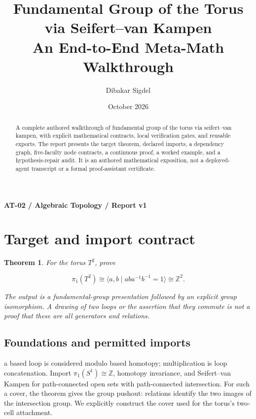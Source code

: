 \documentclass[preprint,12pt,aps,pra,showkeys,amsmath,amssymb,superscriptaddress,floatfix]{revtex4-2}
\newtheorem{theorem}{Theorem}[section]
\theoremstyle{definition}
\theoremstyle{remark}
\begin{document}
\title{Fundamental Group of the Torus via Seifert--van Kampen\\[4pt]\large An End-to-End Meta-Math Walkthrough}

\author{Dibakar Sigdel}


\date{October 2026}

\begin{abstract}

A complete authored walkthrough of fundamental group of the torus via
seifert--van kampen, with explicit mathematical contracts, local
verification gates, and reusable exports. The report presents the target
theorem, declared imports, a dependency graph, five-faculty node
contracts, a continuous proof, a worked example, and a hypothesis-repair
audit. It is an authored mathematical exposition, not a deployed-agent
transcript or a formal proof-assistant certificate.

\end{abstract}\maketitle\linespread{1.12}\selectfont

\noindent\textbf{AT-02 / Algebraic Topology / Report v1}

\section{Target and import contract}

\begin{theorem}

For the torus \(T^2\), prove

\[\pi_1(T^2)\cong\langle a,b\mid aba^{-1}b^{-1}=1\rangle\cong\mathbb Z^2.\]

The output is a fundamental-group presentation followed by an explicit
group isomorphism. A drawing of two loops or the assertion that they
commute is not a proof that these are all generators and relations.

\end{theorem}

\subsection{Foundations and permitted imports}

a based loop is considered modulo based homotopy; multiplication is loop
concatenation. Import \(\pi_1(S^1)\cong\mathbb Z\), homotopy invariance,
and Seifert--van Kampen for path-connected open sets with path-connected
intersection. For such a cover, the theorem gives the group pushout:
relations identify the two images of the intersection group. We
explicitly construct the cover used for the torus's two-cell attachment.
\end{document}
